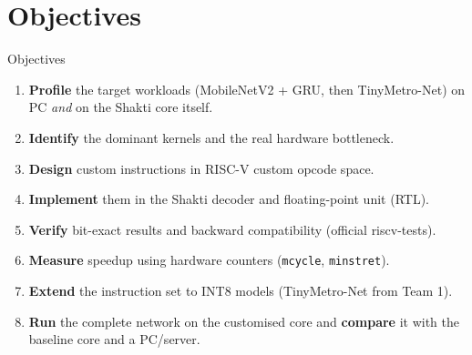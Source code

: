 \documentclass[aspectratio=169,11pt]{beamer}
\begin{document}
\section{Objectives}
\begin{frame}{Objectives}
  \begin{enumerate}
    \item \textbf{Profile} the target workloads (MobileNetV2 + GRU, then
          TinyMetro-Net) on PC \emph{and} on the Shakti core itself.
    \item \textbf{Identify} the dominant kernels and the real hardware bottleneck.
    \item \textbf{Design} custom instructions in RISC-V custom opcode space.
    \item \textbf{Implement} them in the Shakti decoder and floating-point unit (RTL).
    \item \textbf{Verify} bit-exact results and backward compatibility
          (official riscv-tests).
    \item \textbf{Measure} speedup using hardware counters
          (\texttt{mcycle}, \texttt{minstret}).
    \item \textbf{Extend} the instruction set to INT8 models (TinyMetro-Net from Team 1).
    \item \textbf{Run} the complete network on the customised core and
          \textbf{compare} it with the baseline core and a PC/server.
  \end{enumerate}
\end{frame}

\end{document}
